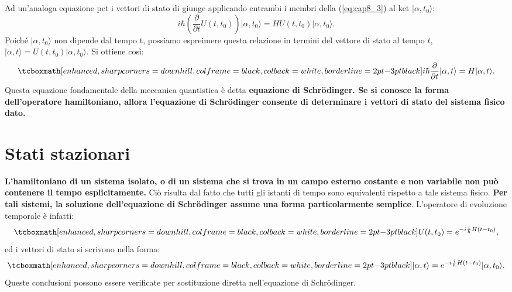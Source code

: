 \documentclass[a4paper,12pt,oneside]{book}
\begin{document}
Ad un'analoga equazione pet i vettori di stato di giunge applicando entrambi i membri della (\ref{eq:cap8_3}) al ket $\vert \alpha, t_0\rangle$:
	\begin{equation}
		i\hbar \left( \frac{\partial}{\partial t} U (t,t_0) \right) \vert \alpha, t_0\rangle= H U(t, t_0)\vert \alpha, t_0\rangle.
	\end{equation}
Poiché $\vert \alpha, t_0\rangle$ non dipende dal tempo t, possiamo espreimere questa relazione in termini del vettore di stato al tempo $t$, $\vert \alpha, t\rangle= U(t,t_0)\vert \alpha, t_0\rangle$. Si ottiene così:
	\begin{equation}
		\tcboxmath[enhanced, sharp corners=downhill, colframe=black, colback=white, borderline={2pt}{-3pt}{black}]{
		i\hbar \frac{\partial}{\partial t} \vert \alpha, t \rangle = H \vert \alpha, t \rangle.
		}
	\end{equation}
Questa equazione fondamentale della meccanica quantistica è detta \textbf{equazione di Schr\"{o}dinger. Se si conosce la forma dell'operatore hamiltoniano, allora l'equazione di Schr\"{o}dinger consente di determinare i vettori di stato del sistema fisico dato.}
\section[Stati stazionari]{Stati stazionari}
\textbf{L'hamiltoniano di un sistema isolato, o di un sistema che si trova in un campo esterno costante e non variabile non può contenere il tempo esplicitamente.} Ciò risulta dal fatto che tutti gli istanti di tempo sono equivalenti rispetto a tale sistema fisico. \textbf{Per tali sistemi, la soluzione dell'equazione di Schr\"{o}dinger assume una forma particolarmente semplice}. L'operatore di evoluzione temporale è infatti:
	\begin{equation}
		\tcboxmath[enhanced, sharp corners=downhill, colframe=black, colback=white, borderline={2pt}{-3pt}{black}]{
		U(t,t_0)= e^{-i\frac{i}{\hbar}H(t-t_0)},
		}
	\end{equation}
ed i vettori di stato si scrivono nella forma:
	\begin{equation}
		\tcboxmath[enhanced, sharp corners=downhill, colframe=black, colback=white, borderline={2pt}{-3pt}{black}]{
			\vert \alpha, t \rangle = e^{-i\frac{i}{\hbar}H(t-t_0)}\vert \alpha, t_0 \rangle.
			}
	\end{equation}
Queste conclusioni possono essere verificate per sostituzione diretta nell'equazione di Schr\"{o}dinger.\\
\end{document}
